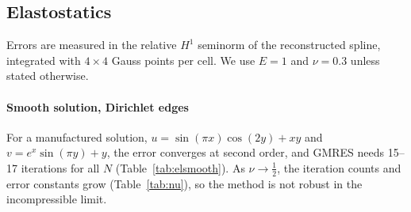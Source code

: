 \documentclass[preprint,12pt]{elsarticle}
\theoremstyle{remark}
\begin{document}
\subsection{Elastostatics}
Errors are measured in the relative $H^1$ seminorm of the reconstructed spline, integrated with
$4\times4$ Gauss points per cell. We use $E=1$ and $\nu=0.3$ unless stated otherwise.

\paragraph{Smooth solution, Dirichlet edges} For a manufactured solution,
$u=\sin(\pi x)\cos(2y)+xy$ and $v=e^x\sin(\pi y)+y$, the error converges at second order, and GMRES
needs 15--17 iterations for all $N$ (Table~\ref{tab:elsmooth}). As $\nu\to\frac12$, the iteration
counts and error constants grow (Table~\ref{tab:nu}), so the method is not robust in the
incompressible limit.
\end{document}
